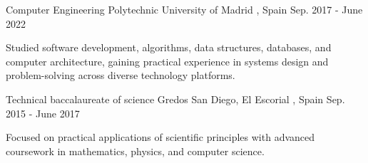 

\begin{cventries}

  \cventry
    {Computer Engineering} %
    {Polytechnic University of Madrid} %
    {\comMadrid, Spain} %
    {Sep. 2017 - June 2022} %
    {
      \begin{cvitems} %
        \item {Studied software development, algorithms, data structures, databases, and computer architecture, gaining practical experience in systems design and problem-solving across diverse technology platforms.}
      \end{cvitems}
    }

  \cventry
    {Technical baccalaureate of science} %
    {Gredos San Diego, El Escorial} %
    {\comMadrid, Spain} %
    {Sep. 2015 - June 2017} %
    {
      \begin{cvitems} %
        \item {Focused on practical applications of scientific principles with advanced coursework in mathematics, physics, and computer science.}
      \end{cvitems}
    }

\end{cventries}
